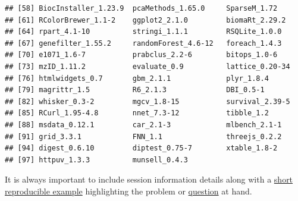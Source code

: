 \begin{verbatim}
## [58] BiocInstaller_1.23.9  pcaMethods_1.65.0     SparseM_1.72         
## [61] RColorBrewer_1.1-2    ggplot2_2.1.0         biomaRt_2.29.2       
## [64] rpart_4.1-10          stringi_1.1.1         RSQLite_1.0.0        
## [67] genefilter_1.55.2     randomForest_4.6-12   foreach_1.4.3        
## [70] e1071_1.6-7           prabclus_2.2-6        bitops_1.0-6         
## [73] mzID_1.11.2           evaluate_0.9          lattice_0.20-34      
## [76] htmlwidgets_0.7       gbm_2.1.1             plyr_1.8.4           
## [79] magrittr_1.5          R6_2.1.3              DBI_0.5-1            
## [82] whisker_0.3-2         mgcv_1.8-15           survival_2.39-5      
## [85] RCurl_1.95-4.8        nnet_7.3-12           tibble_1.2           
## [88] msdata_0.12.1         car_2.1-3             mlbench_2.1-1        
## [91] grid_3.3.1            FNN_1.1               threejs_0.2.2        
## [94] digest_0.6.10         diptest_0.75-7        xtable_1.8-2         
## [97] httpuv_1.3.3          munsell_0.4.3
\end{verbatim}

It is always important to include session information details along with
a \href{http://adv-r.had.co.nz/Reproducibility.html}{short reproducible
example} highlighting the problem or
\href{https://support.bioconductor.org/}{question} at hand.
